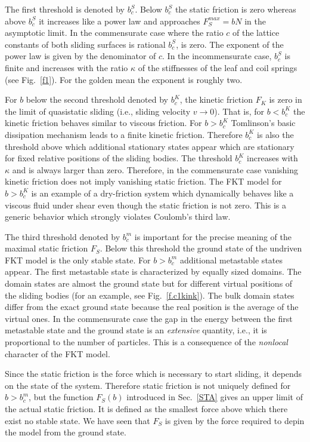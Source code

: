 The first threshold is denoted by $b_c^S$. Below $b_c^S$ the static
friction is zero whereas above $b_c^S$ it increases like a power law
and approaches $F_S^{max}=bN$ in the asymptotic limit. In the
commensurate case where the ratio $c$ of the lattice constants of
both sliding surfaces is rational $b_c^S$, is zero. The exponent of
the power law is given by the denominator of $c$. In the
incommensurate case, $b_c^S$ is finite and increases with the ratio
$\kappa$ of the stiffnesses of the leaf and coil springs (see 
Fig.~\ref{f1}). For the golden mean the exponent is roughly two.

For $b$ below the second threshold denoted by $b_c^K$, the kinetic
friction $F_K$ is zero in the limit of quasistatic sliding (i.e.,
sliding velocity $v\to 0$). That is, for $b<b_c^K$ the kinetic
friction behaves similar to viscous friction. For $b>b_c^K$
Tomlinson's basic dissipation mechanism leads to a finite kinetic
friction. Therefore $b_c^K$ is also the threshold above which
additional stationary states appear which are stationary for fixed
relative positions of the sliding bodies.  The threshold $b_c^K$
increases with $\kappa$ and is always larger than zero. Therefore, in
the commensurate case vanishing kinetic friction does not imply
vanishing static friction.  The FKT model for $b>b_c^K$ is an example
of a dry-friction system which dynamically behaves like a viscous
fluid under shear even though the static friction is not zero. This
is a generic behavior which strongly violates Coulomb's third law.

The third threshold denoted by $b_c^m$ is important for the precise 
meaning of the maximal static friction $F_S$. Below this threshold 
the ground state of the undriven FKT model is the only stable state.
For $b>b_c^m$ additional metastable states appear. The first
metastable state is characterized by equally sized domains. The
domain states are almost the ground state but for different virtual
positions of the sliding bodies (for an example, see
Fig.~\ref{f.c1kink}). The bulk domain states differ from the exact
ground state because the real position is the average of the virtual
ones. In the commensurate case the gap in the energy between the
first metastable state and the ground state is an {\em extensive\/}
quantity, i.e., it is proportional to the number of particles. This
is a consequence of the {\em nonlocal\/} character of the FKT model. 

Since the static friction is the force which is necessary to start
sliding, it depends on the state of the system. Therefore static
friction is not uniquely defined for $b>b_c^m$, but the function
$F_S(b)$ introduced in Sec.~\ref{STA} gives an upper limit of the
actual static friction. It is defined as the smallest force above
which there exist no stable state. We have seen that $F_S$ is given
by the force required to depin the model from the ground state.

